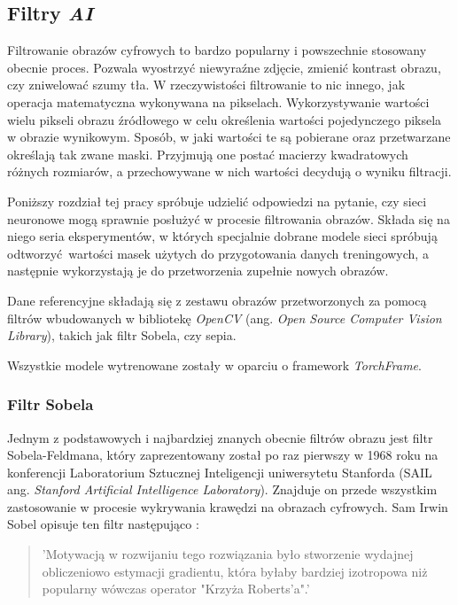 \subsection[Filtry \textit{AI} (Piotr Winkler)]{Filtry \textit{AI}}
\label{Filtry_AI}

  Filtrowanie obrazów cyfrowych to bardzo popularny i powszechnie stosowany
  obecnie proces. Pozwala wyostrzyć niewyraźne zdjęcie, zmienić kontrast obrazu,
  czy zniwelować szumy tła. W rzeczywistości filtrowanie to nic innego, jak
  operacja matematyczna wykonywana na pikselach. Wykorzystywanie wartości wielu
  pikseli obrazu źródłowego w celu określenia wartości pojedynczego piksela w
  obrazie wynikowym. Sposób, w jaki wartości te są pobierane oraz przetwarzane
  określają tak zwane maski. Przyjmują one postać macierzy kwadratowych różnych
  rozmiarów, a przechowywane w nich wartości decydują o wyniku filtracji.

  Poniższy rozdział tej pracy spróbuje udzielić odpowiedzi na pytanie, czy
  sieci neuronowe mogą sprawnie posłużyć w procesie filtrowania obrazów.
  Składa się na niego seria eksperymentów, w których specjalnie dobrane modele
  sieci spróbują odtworzyć wartości masek użytych do przygotowania danych
  treningowych, a następnie wykorzystają je do przetworzenia zupełnie nowych
  obrazów.

  Dane referencyjne składają się z zestawu obrazów przetworzonych za pomocą
  filtrów wbudowanych w bibliotekę \textit{OpenCV} (ang. \textit{Open Source Computer Vision Library}), takich jak filtr Sobela, czy
  sepia.

  Wszystkie modele wytrenowane zostały w oparciu o framework \textit{TorchFrame}.

  \subsubsection{Filtr Sobela}

    Jednym z podstawowych i najbardziej znanych obecnie filtrów obrazu jest
    filtr Sobela-Feldmana, który zaprezentowany został po raz pierwszy w 1968
    roku na konferencji Laboratorium Sztucznej Inteligencji uniwersytetu Stanforda
    (SAIL ang. \textit{Stanford Artificial Intelligence Laboratory}). Znajduje on przede wszystkim zastosowanie w procesie wykrywania krawędzi
    na obrazach cyfrowych. Sam Irwin Sobel opisuje ten filtr następująco \cite{sobel}:

    \begin{quote}
      'Motywacją w rozwijaniu tego rozwiązania było stworzenie wydajnej obliczeniowo
      estymacji gradientu, która byłaby bardziej izotropowa niż popularny wówczas operator
      "Krzyża Roberts'a".'
    \end{quote}

